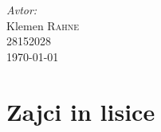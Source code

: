 \documentclass[slovene,11pt,a4paper]{article}
\numberwithin{equation}{section} %
\numberwithin{figure}{section} %
\numberwithin{table}{section} %
\begin{document}
\begin{titlepage}



\Large \emph{Avtor:}\\
Klemen \textsc{Rahne}\\
28152028\\[2cm]

{\large \today } \\[0.5cm] %

	

\end{titlepage}





\section{Zajci in lisice}
\end{document}
